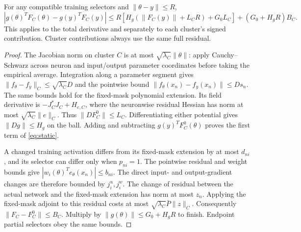 \begin{proposition}\label{prop:static}
For any compatible training selectors and $\|\theta-y\|\le R$,
\begin{equation}\label{eq:static}
 \left|g(\theta)^TF_C(\theta)-g(y)^TF_C(y)\right|
 \le R\left[H_g(\|F_C(y)\|+L_CR)+G_0L_C\right]
                   +(G_0+H_gR)B_C.
\end{equation}
This applies to the total derivative and separately to each cluster's
signed contribution. Cluster contributions always use the same full residual.
\end{proposition}
\begin{proof}
The Jacobian norm on cluster $C$ is at most
$\sqrt{\lambda_C}\|\theta\|$: apply Cauchy--Schwarz across neuron and
input/output parameter coordinates before taking the empirical average.
Integration along a parameter segment gives
$\|f_\theta-f_y\|_C\le\sqrt{\lambda_C}D$ and the pointwise bound
$\|f_\theta(x_n)-f_y(x_n)\|\le Ds_n$.
The same bounds hold for the fixed-mask polynomial extension.
Its field derivative is $-J_C^*J_C+H_{e,C}$, where the neuronwise
residual Hessian has norm at most
$\sqrt{\lambda_C}\|e\|_C$. Thus
$\|DF_C^0\|\le L_C$. Differentiating either potential gives
$\|Dg\|\le H_g$ on the ball. Adding and subtracting
$g(y)^TF_C^0(\theta)$ proves the first term of \eqref{eq:static}.

A changed training activation differs from its fixed-mask extension by at
most $d_{ni}$, and its selector can differ only when $p_{ni}=1$.
The pointwise residual and weight bounds give
$|w_i(\theta)^Te_\theta(x_n)|\le b_{ni}$. The direct input- and
output-gradient changes are therefore bounded by $j_i^u,j_i^w$.
The change of residual between the actual network and the fixed-mask
extension has norm at most $z_n$. Applying the fixed-mask adjoint to
this residual costs at most $\sqrt{\lambda_C}\bar P\|z\|_C$.
Consequently $\|F_C-F_C^0\|\le B_C$. Multiply by
$\|g(\theta)\|\le G_0+H_gR$ to finish. Endpoint partial selectors obey
the same bounds.
\end{proof}

